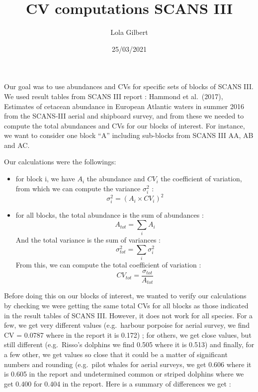 \documentclass[
]{article}
\title{CV computations SCANS III}
\author{Lola Gilbert}
\date{25/03/2021}
\providecommand{\tightlist}{%
  \setlength{\itemsep}{0pt}\setlength{\parskip}{0pt}}
\begin{document}
\maketitle

Our goal was to use abundances and CVs for specific sets of blocks of
SCANS III. We used result tables from SCANS III report : Hammond et
al.~(2017), Estimates of cetacean abundance in European Atlantic waters
in summer 2016 from the SCANS-III aerial and shipboard survey, and from
these we needed to compute the total abundances and CVs for our blocks
of interest. For instance, we want to consider one block ``A'' including
sub-blocks from SCANS III AA, AB and AC.

Our calculations were the followings:

\begin{itemize}
\tightlist
\item
  for block i, we have \(A_i\) the abundance and \(CV_i\) the
  coefficient of variation, from which we can compute the variance
  \(\sigma_i^2\) : \[ \sigma_i^2 = (A_i\times CV_i)^2 \]
\item
  for all blocks, the total abundance is the sum of abundances :
  \[ A_{tot} = \sum_i A_i \] And the total variance is the sum of
  variances : \[ \sigma_{tot}^2 = \sum_i \sigma_i^2\] From this, we can
  compute the total coefficient of variation :
  \[ CV_{tot} = \frac{\sigma_{tot}} {A_{tot}}\]
\end{itemize}

Before doing this on our blocks of interest, we wanted to verify our
calculations by checking we were getting the same total CVs for all
blocks as those indicated in the result tables of SCANS III. However, it
does not work for all species. For a few, we get very different values
(e.g.~harbour porpoise for aerial survey, we find CV = 0.0787 where in
the report it is 0.172) ; for others, we get close values, but still
different (e.g.~Risso's dolphins we find 0.505 where it is 0.513) and
finally, for a few other, we get values so close that it could be a
matter of significant numbers and rounding (e.g.~pilot whales for aerial
surveys, we get 0.606 where it is 0.605 in the report and undetermined
common or striped dolphins where we get 0.400 for 0.404 in the report.
Here is a summary of differences we get :
\end{document}
